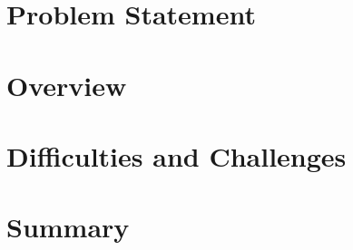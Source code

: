 \section{Problem Statement}
\section{Overview}
\section{Difficulties and Challenges}
\section{Summary}